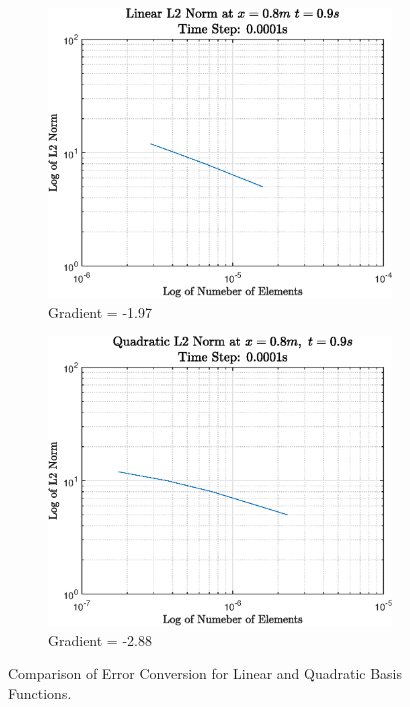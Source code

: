 \documentclass[11pt]{article}
\begin{document}
\begin{figure}[ht] 
        \centering
        \begin{subfigure}[b]{0.475\textwidth}
            \centering
            \includegraphics[width=\textwidth]{epsQ1L2O1}
            \caption[]%
            {{\small Gradient = -1.97 }}    
            \label{fig:q1l2o1}
        \end{subfigure}
        \hfill
        \begin{subfigure}[b]{0.475\textwidth}  
            \centering 
            \includegraphics[width=\textwidth]{epsQ1L2O2}
            \caption[]%
            {{\small Gradient = -2.88}}    
            \label{fig:q1l2o2}
        \end{subfigure}
        \caption[ ]
        {\small Comparison of Error Conversion for Linear and Quadratic Basis Functions.} 
        \label{fig:q1bl2grad}
\end{figure}
\pagebreak
\end{document}
